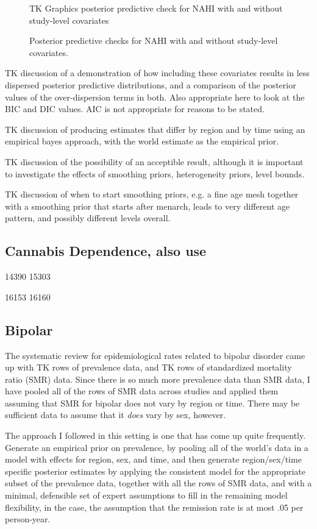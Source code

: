 \begin{figure}
\begin{center}
TK Graphics posterior predictive check for NAHI with and without
study-level covariates
\end{center}
\caption{Posterior predictive checks for NAHI with and without
  study-level covariates.}
\label{pms-ppc}
\end{figure}

TK discussion of a demonstration of how including these covariates
results in less dispersed posterior predictive distributions, and a
comparison of the posterior values of the over-dispersion terms in
both.  Also appropriate here to look at the BIC and DIC values.  AIC
is not appropriate for reasons to be stated.

TK discussion of producing estimates that differ by region and  by time
using an empirical bayes approach, with the world estimate as the
empirical prior.

TK discussion of the possibility of an acceptible result, although it
is important to investigate the effects of smoothing priors,
heterogeneity priors, level bounds.

TK discussion of when to start smoothing priors, e.g. a fine age mesh
together with a smoothing prior that starts after menarch, leads to
very different age pattern, and possibly different levels overall.

\subsection{Cannabis Dependence, also use}
14390 15303 

16153 16160 

\subsection{Bipolar}
The systematic review for epidemiological rates related to bipolar
disorder came up with TK rows of prevalence data, and TK rows of
standardized mortality ratio (SMR) data.  Since there is so much more
prevalence data than SMR data, I have pooled all of the rows of SMR
data across studies and applied them assuming that SMR for bipolar
does not vary by region or time.  There may be sufficient data to assume
that it \emph{does} vary by sex, however. 

The approach I followed in this setting is one that has come up quite
frequently.  Generate an empirical prior on prevalence, by pooling all
of the world's data in a model with effects for region, sex, and
time, and then generate region/sex/time specific posterior estimates
by applying the consistent model for the appropriate subset of the
prevalence data, together with all the rows of SMR data, and with a
minimal, defensible set of expert assumptions to fill in the remaining
model flexibility, in the case, the assumption that the remission rate
is at most .05 per person-year.

